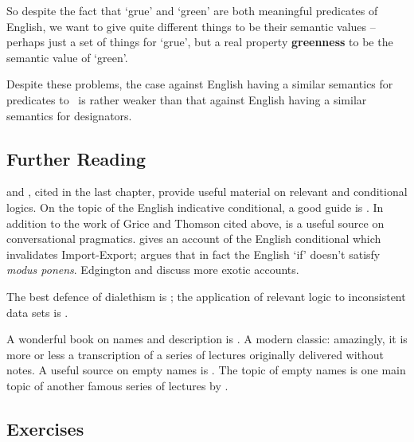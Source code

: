 So despite the fact that `grue' and `green' are both meaningful predicates of English, we want to give quite different things to be their semantic values – perhaps just a set of things for `grue', but a real property \textbf{greenness} to be the semantic value of `green'.

Despite these problems, the case against English having a similar semantics for predicates to \ltwo\ is rather weaker than that against English having a similar semantics for designators.


{\small
\subsection*{Further Reading}


\citet{bevpospa} and \citet{burphilo}, cited in the last chapter, provide useful material on relevant and conditional logics. On the topic of the English indicative conditional, a good guide is \citet{edgington}. In addition to the work of Grice and Thomson cited above, \citet{sep-implicature} is a useful source on conversational pragmatics. \citet{stalnaker} gives an account of the English conditional which invalidates Import-Export; \citet{mcgee} argues that in fact the English `if' doesn't satisfy \emph{modus ponens}. Edgington and \citet{kratzer} discuss more exotic accounts.

 The best defence of dialethism is \citet{priinco}; the application of relevant logic to inconsistent data sets is \citet{belusefov}.  

A wonderful book on names and description is \citet{krinamne}. A modern classic: amazingly, it is more or less a transcription of a series of lectures originally delivered without notes. A useful source on empty names is \citet{capempna}. The topic of empty names is one main topic of another famous series of lectures by \citet{krirefex}.



\subsection*{Exercises}


\begin{enumerate}
	

\end{enumerate}}
